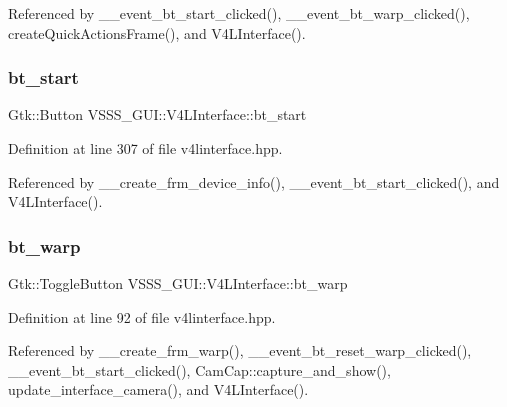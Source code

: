 Referenced by \+\_\+\+\_\+event\+\_\+bt\+\_\+start\+\_\+clicked(), \+\_\+\+\_\+event\+\_\+bt\+\_\+warp\+\_\+clicked(), create\+Quick\+Actions\+Frame(), and V4\+L\+Interface().

\mbox{\label{class_v_s_s_s___g_u_i_1_1_v4_l_interface_a95958ffffbfb95a6a0fdefb2ffa6d3b9}} 
\subsubsection{\texorpdfstring{bt\+\_\+start}{bt\_start}}
{\footnotesize\ttfamily Gtk\+::\+Button V\+S\+S\+S\+\_\+\+G\+U\+I\+::\+V4\+L\+Interface\+::bt\+\_\+start\hspace{0.3cm}{\ttfamily [private]}}



Definition at line 307 of file v4linterface.\+hpp.



Referenced by \+\_\+\+\_\+create\+\_\+frm\+\_\+device\+\_\+info(), \+\_\+\+\_\+event\+\_\+bt\+\_\+start\+\_\+clicked(), and V4\+L\+Interface().

\mbox{\label{class_v_s_s_s___g_u_i_1_1_v4_l_interface_a6cdcc092c26848cd7009e56084ee1b23}} 
\subsubsection{\texorpdfstring{bt\+\_\+warp}{bt\_warp}}
{\footnotesize\ttfamily Gtk\+::\+Toggle\+Button V\+S\+S\+S\+\_\+\+G\+U\+I\+::\+V4\+L\+Interface\+::bt\+\_\+warp}



Definition at line 92 of file v4linterface.\+hpp.



Referenced by \+\_\+\+\_\+create\+\_\+frm\+\_\+warp(), \+\_\+\+\_\+event\+\_\+bt\+\_\+reset\+\_\+warp\+\_\+clicked(), \+\_\+\+\_\+event\+\_\+bt\+\_\+start\+\_\+clicked(), Cam\+Cap\+::capture\+\_\+and\+\_\+show(), update\+\_\+interface\+\_\+camera(), and V4\+L\+Interface().


